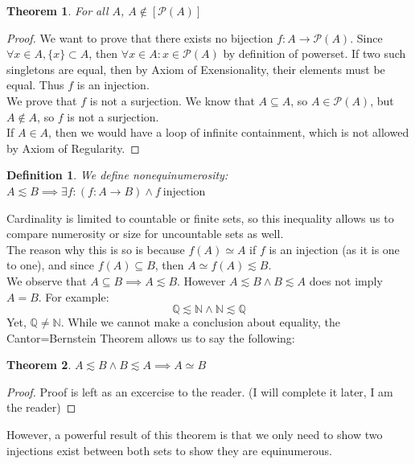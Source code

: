 \documentclass{article}
\newtheorem{thm}{Theorem}[section]
\newtheorem{defn}{Definition}[section]
\begin{document}
\medskip
\begin{thm}
For all $A$, $A \notin [\mathcal{P}(A)]$
\end{thm}
\begin{proof}
We want to prove that there exists no bijection $f: A \xrightarrow{} \mathcal{P}(A)$. Since $\forall x \in A, \{x\} \subset A$, then $\forall x \in A: x \in \mathcal{P}(A)$ by definition of powerset. If two such singletons are equal, then by Axiom of Exensionality, their elements must be equal. Thus $f$ is an injection.\\

We prove that $f$ is not a surjection. We know that $A \subseteq A$, so $A \in \mathcal{P}(A)$, but $A \notin A$, so $f$ is not a surjection.\\

If $A \in A$, then we would have a loop of infinite containment, which is not allowed by Axiom of Regularity.
\end{proof}

\medskip
\begin{defn}
We define nonequinumerosity: $A \lesssim B \implies \exists f: (f: A \xrightarrow{} B) \land f \ \text{injection}$
\end{defn}
Cardinality is limited to countable or finite sets, so this inequality allows us to compare numerosity or size for uncountable sets as well.\\

The reason why this is so is because $f(A) \simeq A$ if $f$ is an injection (as it is one to one), and since $f(A) \subseteq B$, then $A \simeq f(A) \lesssim B$.\\

We observe that $A \subseteq B \implies A \lesssim B$. However $A \lesssim B \land B \lesssim A$ does not imply $A = B$. For example:
\begin{equation*}
    \mathbb{Q} \lesssim \mathbb{N} \land \mathbb{N} \lesssim \mathbb{Q} 
\end{equation*}
Yet, $\mathbb{Q} \neq \mathbb{N}$. While we cannot make a conclusion about equality, the Cantor=Bernstein Theorem allows us to say the following:
\begin{thm}
$A \lesssim B \land B \lesssim A \implies A \simeq B$
\end{thm}
\begin{proof}
Proof is left as an excercise to the reader. (I will complete it later, I am the reader)
\end{proof}
However, a powerful result of this theorem is that we only need to show two injections exist between both sets to show they are equinumerous.\\
\end{document}
